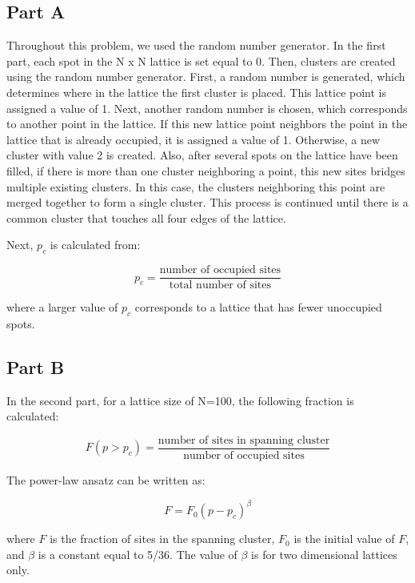 \documentclass[12pt]{article}
\begin{document}
\subsection{Part A}
\indent \indent Throughout this problem, we used the random number generator.
 In the first part, each spot in the N x N lattice is set equal to 0. Then, clusters are created using the random number generator. First, a random number is generated, which determines where in the lattice the first cluster is placed. This lattice point is assigned a value of 1. Next, another random number is chosen, which corresponds to another point in the lattice. If this new lattice point neighbors the point in the lattice that is already occupied, it is assigned a value of 1. Otherwise, a new cluster with value 2 is created.  \newline
 \indent Also, after several spots on the lattice have been filled, if there is more than one cluster neighboring a point, this new sites bridges multiple existing clusters. In this case, the clusters neighboring this point are merged together to form a single cluster. This process is continued until there is a common cluster that touches all four edges of the lattice. \newline
 
\indent Next, $p_c$ is calculated from:

\begin{equation}
	p_c=\frac{\text{number of occupied sites}}{\text{total number of sites}}
\end{equation}

\indent where a larger value of $p_c$ corresponds to a lattice that has fewer unoccupied spots.

\subsection{Part B}
\indent \indent In the second part, for a lattice size of N=100, the following fraction is calculated:

\begin{equation}
F(p>p_c)=\frac{\text{number of sites in spanning cluster}}{\text{number of occupied sites}}
\end{equation}

\indent The power-law ansatz can be written as:

\begin{equation}
F=F_0(p-p_c)^\beta
\end{equation}

where $F$ is the fraction of sites in the spanning cluster, $F_0$ is the initial value of $F$, and $\beta$ is a constant equal to 5/36. The value of $\beta$ is for two dimensional lattices only.\newline
\end{document}
